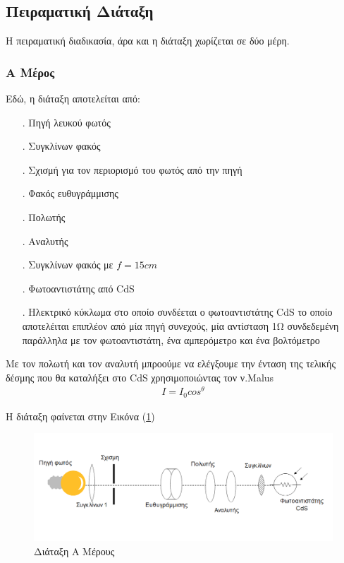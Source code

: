 \documentclass[a4paper]{article}
\begin{document}
\subsection*{Πειραματική Διάταξη}
	Η πειραματική διαδικασία, άρα και η διάταξη χωρίζεται σε δύο μέρη.
	\subsubsection*{Α Μέρος}
		Εδώ, η διάταξη αποτελείται από: 
			\begin{itemize}
				\item[.] Πηγή λευκού φωτός \hspace{-0.2cm}
				\item[.] Συγκλίνων φακός   \hspace{-0.2cm}
				\item[.] Σχισμή για τον περιορισμό του φωτός από την πηγή \hspace{-0.2cm}
				\item[.] Φακός ευθυγράμμισης \hspace{-0.2cm}
				\item[.] Πολωτής \hspace{-0.2cm}
				\item[.] Αναλυτής \hspace{-0.2cm}
				\item[.] Συγκλίνων φακός με $f=15cm$ \hspace{-0.2cm}
				\item[.] Φωτοαντιστάτης από CdS \hspace{-0.2cm}
				\item[.] Ηλεκτρικό κύκλωμα στο οποίο συνδέεται ο φωτοαντιστάτης CdS  το οποίο αποτελέιται επιπλέον από μία πηγή συνεχούς, μία αντίσταση 1Ω συνδεδεμένη παράλληλα με τον φωτοαντιστάτη, ένα αμπερόμετρο και ένα βολτόμετρο
			\end{itemize}
			Με τον πολωτή και τον αναλυτή μπροούμε να ελέγξουμε την ένταση της τελικής δέσμης που θα καταλήξει στο CdS χρησιμοποιώντας τον ν.Malus
			\begin{align}\label{4}
				I = I_0cos^\theta
			\end{align}
			
			Η διάταξη φαίνεται στην Εικόνα (\ref{im1})
				\begin{figure}[h!]
					\centering
					\includegraphics[scale=0.5]{part1.png}
					\caption{Διάταξη Α Μέρους}
					\label{im1}
				\end{figure}
				
\end{document}
